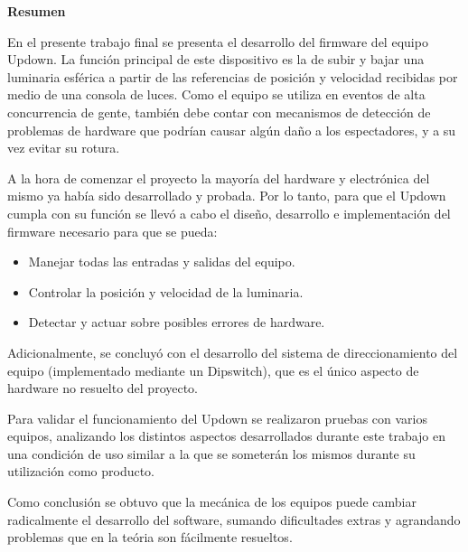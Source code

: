 \thispagestyle{empty}
\begin{center}

	\textbf{\huge Resumen }\\[1cm] 

\end{center}

En el presente trabajo final se presenta el desarrollo del firmware del equipo Updown. La función principal de este dispositivo es la de subir y bajar una luminaria esférica a partir de las referencias de posición y velocidad recibidas por medio de una consola de luces. Como el equipo se utiliza en eventos de alta concurrencia de gente, también debe contar con mecanismos de detección de problemas de hardware que podrían causar algún daño a los espectadores, y a su vez evitar su rotura.

A la hora de comenzar el proyecto la mayoría del hardware y electrónica del mismo ya había sido desarrollado y probada. Por lo tanto, para que el Updown cumpla con su función se llevó a cabo el diseño, desarrollo e implementación del firmware necesario para que se pueda:

\begin{itemize}
	\item Manejar todas las entradas y salidas del equipo.
	\item Controlar la posición y velocidad de la luminaria.
	\item Detectar y actuar sobre posibles errores de hardware.
\end{itemize}

Adicionalmente, se concluyó con el desarrollo del sistema de direccionamiento del equipo (implementado mediante un Dipswitch), que es el único aspecto de hardware no resuelto del proyecto.

Para validar el funcionamiento del Updown se realizaron pruebas con varios equipos, analizando los distintos aspectos desarrollados durante este trabajo en una condición de uso similar a la que se someterán los mismos durante su utilización como producto.

Como conclusión se obtuvo que la mecánica de los equipos puede cambiar radicalmente el desarrollo del software, sumando dificultades extras y agrandando problemas que en la teória son fácilmente resueltos.



